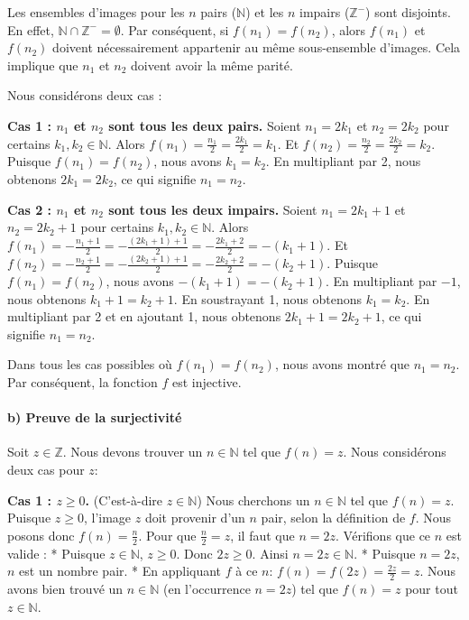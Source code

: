 \documentclass[12pt,a4paper]{report}
\begin{document}
Les ensembles d'images pour les \(n\) pairs (\(\mathbb{N}\)) et les
\(n\) impairs (\(\mathbb{Z}^-\)) sont disjoints. En effet,
\(\mathbb{N} \cap \mathbb{Z}^- = \emptyset\). Par conséquent, si
\(f(n_1) = f(n_2)\), alors \(f(n_1)\) et \(f(n_2)\) doivent
nécessairement appartenir au même sous-ensemble d'images. Cela implique
que \(n_1\) et \(n_2\) doivent avoir la même parité.

Nous considérons deux cas :

\textbf{Cas 1 : \(n_1\) et \(n_2\) sont tous les deux pairs.} Soient
\(n_1 = 2k_1\) et \(n_2 = 2k_2\) pour certains
\(k_1, k_2 \in \mathbb{N}\). Alors
\(f(n_1) = \frac{n_1}{2} = \frac{2k_1}{2} = k_1\). Et
\(f(n_2) = \frac{n_2}{2} = \frac{2k_2}{2} = k_2\). Puisque
\(f(n_1) = f(n_2)\), nous avons \(k_1 = k_2\). En multipliant par 2,
nous obtenons \(2k_1 = 2k_2\), ce qui signifie \(n_1 = n_2\).

\textbf{Cas 2 : \(n_1\) et \(n_2\) sont tous les deux impairs.} Soient
\(n_1 = 2k_1+1\) et \(n_2 = 2k_2+1\) pour certains
\(k_1, k_2 \in \mathbb{N}\). Alors
\(f(n_1) = -\frac{n_1+1}{2} = -\frac{(2k_1+1)+1}{2} = -\frac{2k_1+2}{2} = -(k_1+1)\).
Et
\(f(n_2) = -\frac{n_2+1}{2} = -\frac{(2k_2+1)+1}{2} = -\frac{2k_2+2}{2} = -(k_2+1)\).
Puisque \(f(n_1) = f(n_2)\), nous avons \(-(k_1+1) = -(k_2+1)\). En
multipliant par \(-1\), nous obtenons \(k_1+1 = k_2+1\). En soustrayant
1, nous obtenons \(k_1 = k_2\). En multipliant par 2 et en ajoutant 1,
nous obtenons \(2k_1+1 = 2k_2+1\), ce qui signifie \(n_1 = n_2\).

Dans tous les cas possibles où \(f(n_1) = f(n_2)\), nous avons montré
que \(n_1 = n_2\). Par conséquent, la fonction \(f\) est injective.

\paragraph{b) Preuve de la
surjectivité}\label{b-preuve-de-la-surjectivituxe9}

Soit \(z \in \mathbb{Z}\). Nous devons trouver un \(n \in \mathbb{N}\)
tel que \(f(n) = z\). Nous considérons deux cas pour \(z\):

\textbf{Cas 1 : \(z \ge 0\).} (C'est-à-dire \(z \in \mathbb{N}\)) Nous
cherchons un \(n \in \mathbb{N}\) tel que \(f(n) = z\). Puisque
\(z \ge 0\), l'image \(z\) doit provenir d'un \(n\) pair, selon la
définition de \(f\). Nous posons donc \(f(n) = \frac{n}{2}\). Pour que
\(\frac{n}{2} = z\), il faut que \(n = 2z\). Vérifions que ce \(n\) est
valide : * Puisque \(z \in \mathbb{N}\), \(z \ge 0\). Donc \(2z \ge 0\).
Ainsi \(n = 2z \in \mathbb{N}\). * Puisque \(n = 2z\), \(n\) est un
nombre pair. * En appliquant \(f\) à ce \(n\):
\(f(n) = f(2z) = \frac{2z}{2} = z\). Nous avons bien trouvé un
\(n \in \mathbb{N}\) (en l'occurrence \(n=2z\)) tel que \(f(n)=z\) pour
tout \(z \in \mathbb{N}\).
\end{document}
